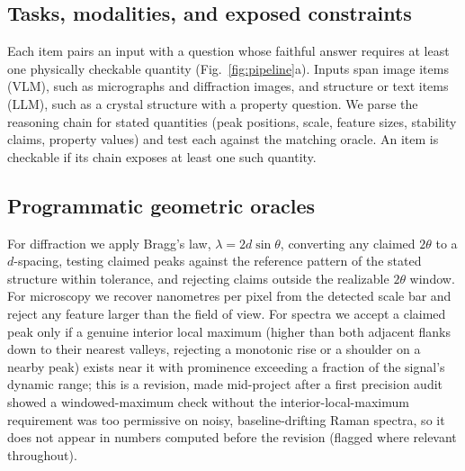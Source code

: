\documentclass[pdflatex,sn-nature]{sn-jnl}
\begin{document}
\subsection*{Tasks, modalities, and exposed constraints}
Each item pairs an input with a question whose faithful answer requires at least one
physically checkable quantity (Fig.~\ref{fig:pipeline}a). Inputs span image items (VLM), such as micrographs and diffraction images, and structure or text items (LLM), such as a crystal structure with a property question. We parse the reasoning chain for stated quantities (peak positions, scale, feature sizes, stability claims, property values) and test each against the matching oracle. An item is checkable if its chain exposes at least one such quantity.

\subsection*{Programmatic geometric oracles}
For diffraction we apply Bragg's law, $\lambda = 2 d \sin\theta$, converting any
claimed $2\theta$ to a $d$-spacing, testing claimed peaks against the reference
pattern of the stated structure within tolerance, and rejecting claims outside the
realizable $2\theta$ window. For microscopy we recover nanometres per pixel from the
detected scale bar and reject any feature larger than the field of view. For spectra
we accept a claimed peak only if a genuine interior local maximum (higher than both
adjacent flanks down to their nearest valleys, rejecting a monotonic rise or a shoulder on a nearby peak) exists near it with prominence exceeding a fraction of the signal's dynamic range; this is a revision, made mid-project after a first precision audit showed a windowed-maximum check without the interior-local-maximum requirement was too permissive on noisy, baseline-drifting Raman spectra, so it does not appear in numbers computed before the revision (flagged where relevant throughout).
\end{document}
